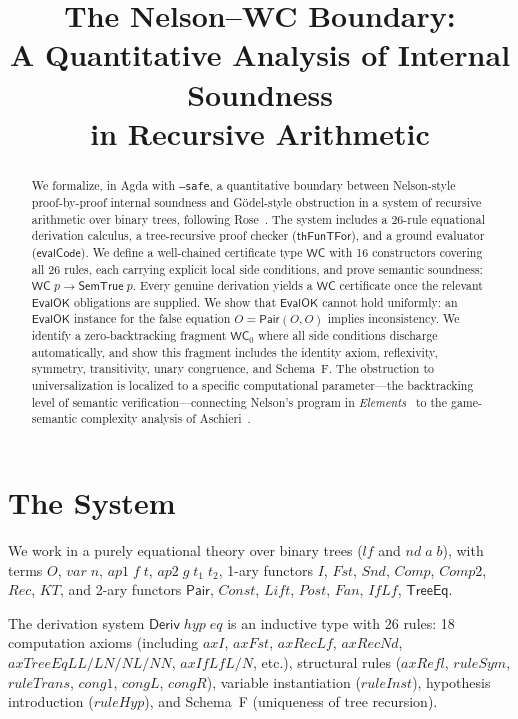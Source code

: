 \documentclass[11pt]{article}
\title{The Nelson--WC Boundary:\\
A Quantitative Analysis of Internal Soundness\\
in Recursive Arithmetic}
\author{}
\date{}
\newcommand{\Deriv}{\mathsf{Deriv}}
\newcommand{\WC}{\mathsf{WC}}
\newcommand{\WCz}{\mathsf{WC}_0}
\newcommand{\SemTrue}{\mathsf{SemTrue}}
\newcommand{\EvalOK}{\mathsf{EvalOK}}
\newcommand{\evalCode}{\mathsf{evalCode}}
\newcommand{\thFunTFor}{\mathsf{thFunTFor}}
\newcommand{\Pair}{\mathsf{Pair}}
\newcommand{\TreeEq}{\mathsf{TreeEq}}
\begin{document}
\maketitle

\begin{abstract}
We formalize, in Agda with \texttt{--safe}, a quantitative boundary between
Nelson-style proof-by-proof internal soundness and G\"odel-style obstruction
in a system of recursive arithmetic over binary trees, following
Rose~\cite{rose1961}.
The system includes a 26-rule equational derivation calculus, a tree-recursive proof
checker ($\thFunTFor$), and a ground evaluator ($\evalCode$).
We define a well-chained certificate type $\WC$ with 16 constructors covering
all 26 rules, each carrying explicit local side conditions, and prove semantic
soundness: $\WC\;p \to \SemTrue\;p$.
Every genuine derivation yields a $\WC$ certificate once the relevant
$\EvalOK$ obligations are supplied.
We show that $\EvalOK$ cannot hold uniformly: an $\EvalOK$ instance for
the false equation $O = \Pair(O,O)$ implies inconsistency.
We identify a zero-backtracking fragment $\WCz$ where all side conditions
discharge automatically, and show this fragment includes the identity axiom,
reflexivity, symmetry, transitivity, unary congruence, and Schema~F.
The obstruction to universalization is localized to a specific
computational parameter---the backtracking level of semantic
verification---connecting Nelson's program in \emph{Elements}~\cite{nelson2015}
to the game-semantic complexity analysis of Aschieri~\cite{aschieri2016}.
\end{abstract}

\section{The System}

We work in a purely equational theory over binary trees
($\mathit{lf}$ and $\mathit{nd}\;a\;b$), with terms
$O$, $\mathit{var}\;n$, $\mathit{ap1}\;f\;t$, $\mathit{ap2}\;g\;t_1\;t_2$,
1-ary functors $I$, $\mathit{Fst}$, $\mathit{Snd}$, $\mathit{Comp}$,
$\mathit{Comp2}$, $\mathit{Rec}$, $\mathit{KT}$,
and 2-ary functors $\Pair$, $\mathit{Const}$, $\mathit{Lift}$,
$\mathit{Post}$, $\mathit{Fan}$, $\mathit{IfLf}$, $\TreeEq$.

The derivation system $\Deriv\;\mathit{hyp}\;\mathit{eq}$ is an
inductive type with 26 rules: 18 computation axioms (including
$\mathit{axI}$, $\mathit{axFst}$, $\mathit{axRecLf}$, $\mathit{axRecNd}$,
$\mathit{axTreeEqLL/LN/NL/NN}$, $\mathit{axIfLfL/N}$, etc.),
structural rules ($\mathit{axRefl}$, $\mathit{ruleSym}$,
$\mathit{ruleTrans}$, $\mathit{cong1}$, $\mathit{congL}$,
$\mathit{congR}$), variable instantiation ($\mathit{ruleInst}$),
hypothesis introduction ($\mathit{ruleHyp}$), and Schema~F
(uniqueness of tree recursion).
\end{document}
